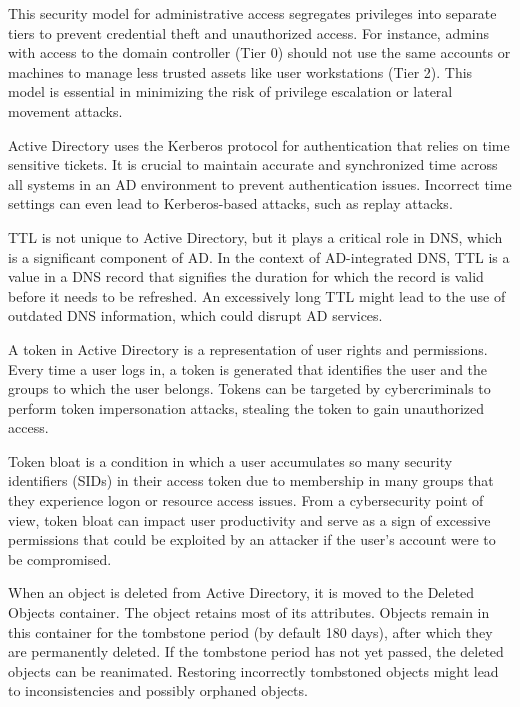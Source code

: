  This security model for administrative access segregates privileges into separate tiers to prevent credential theft and unauthorized access. For instance, admins with access to the domain controller (Tier 0) should not use the same accounts or machines to manage less trusted assets like user workstations (Tier 2). This model is essential in minimizing the risk of privilege escalation or lateral movement attacks.

 Active Directory uses the Kerberos protocol for authentication that relies on time sensitive tickets. It is crucial to maintain accurate and synchronized time across all systems in an AD environment to prevent authentication issues. Incorrect time settings can even lead to Kerberos-based attacks, such as replay attacks.

 TTL is not unique to Active Directory, but it plays a critical role in DNS, which is a significant component of AD. In the context of AD-integrated DNS, TTL is a value in a DNS record that signifies the duration for which the record is valid before it needs to be refreshed. An excessively long TTL might lead to the use of outdated DNS information, which could disrupt AD services.

 A token in Active Directory is a representation of user rights and permissions. Every time a user logs in, a token is generated that identifies the user and the groups to which the user belongs. Tokens can be targeted by cybercriminals to perform token impersonation attacks, stealing the token to gain unauthorized access.

 Token bloat is a condition in which a user accumulates so many security identifiers (SIDs) in their access token due to membership in many groups that they experience logon or resource access issues. From a cybersecurity point of view, token bloat can impact user productivity and serve as a sign of excessive permissions that could be exploited by an attacker if the user’s account were to be compromised.

 When an object is deleted from Active Directory, it is moved to the Deleted Objects container. The object retains most of its attributes. Objects remain in this container for the tombstone period (by default 180 days), after which they are permanently deleted. If the tombstone period has not yet passed, the deleted objects can be reanimated. Restoring incorrectly tombstoned objects might lead to inconsistencies and possibly orphaned objects.

